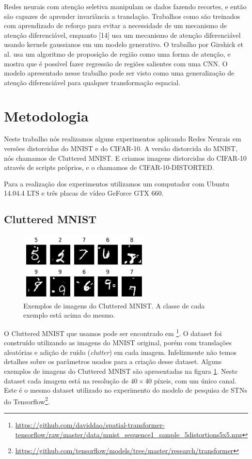 \documentclass[conference]{IEEEtran}
\begin{document}
Redes neurais com atenção seletiva manipulam os dados fazendo recortes, e então são capazes de aprender invariância a translação. Trabalhos como \cite{ba2014multiple,sermanet2014attention} são treinados com aprendizado de reforço para evitar a necessidade de um mecanismo de atenção diferenciável, enquanto [14] usa um mecanismo de atenção diferenciável usando kernels gaussianos em um modelo generativo. O trabalho por Girshick et al. \cite{girshick2014rich} usa um algoritmo de proposição de região como uma forma de atenção, e \cite{erhan2014scalable} mostra que é possível fazer regressão de regiões salientes com uma CNN. O modelo apresentado nesse trabalho pode ser visto como uma generalização de atenção diferenciável para qualquer transformação espacial.

\section{Metodologia}

Neste trabalho nós realizamos alguns experimentos aplicando Redes Neurais em versões distorcidas do MNIST e do CIFAR-10. A versão distorcida do MNIST, nós chamamos de Cluttered MNIST. E criamos imagens distorcidas do CIFAR-10 através de scripts próprios, e o chamamos de CIFAR-10-DISTORTED.

Para a realização dos experimentos utilizamos um computador com Ubuntu 14.04.4 LTS e três placas de vídeo GeForce GTX 660.

\subsection{Cluttered MNIST}

\begin{figure}[ht!]
  \centering
  \includegraphics[width=250px]{img/CM-samples.png}
  \caption{Exemplos de imagens do  Cluttered MNIST. A classe de cada exemplo está acima do mesmo.}
  \label{fig:cm-samples}
\end{figure}

O Cluttered MNIST que usamos pode ser encontrado em \footnote{\url{https://github.com/daviddao/spatial-transformer-tensorflow/raw/master/data/mnist_sequence1_sample_5distortions5x5.npz}}. O dataset foi construído utilizando as imagens do MNIST original, porém com translações aleatórias e adição de ruído (\textit{clutter}) em cada imagem. Infelizmente não temos detalhes sobre os parâmetros usados para a criação desse dataset. Alguns exemplos de imagens do Cluttered MNIST são apresentadas na figura \ref{fig:cm-samples}. Neste dataset cada imagem está na resolução de $40\times40$ píxeis, com um único canal. Este é o mesmo dataset utilizado no experimento do modelo de pesquisa de STNs do Tensorflow\footnote{\url{https://github.com/tensorflow/models/tree/master/research/transformer}}.
\end{document}

